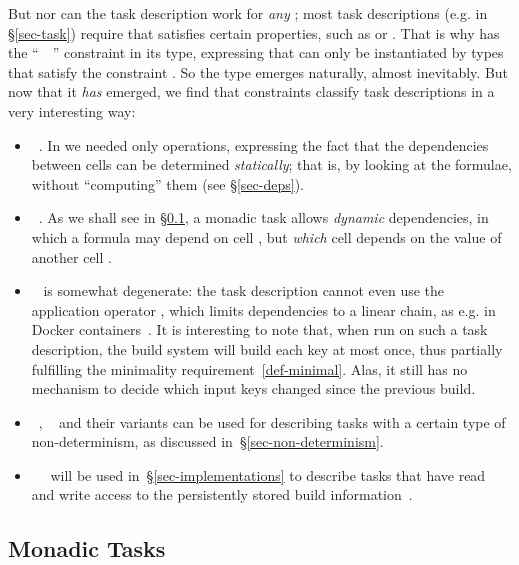 But nor can the task description work for \emph{any} ; most task
descriptions (e.g.  in \S\ref{sec-task}) require that 
satisfies certain properties, such as  or . That is
why  has the ``~~\hs{=>}'' constraint in its type,
expressing that  can only be instantiated by types that satisfy the
constraint . So the type  emerges naturally, almost inevitably.
But now that it \emph{has} emerged, we find that constraints  classify
task descriptions in a very interesting way:
\begin{itemize}
\item {}~. In  we needed only 
  operations, expressing the fact that the dependencies between cells can be
  determined \emph{statically}; that is, by looking at the formulae, without
  ``computing'' them (see \S\ref{sec-deps}).
\item {}~. As we shall see in \S\ref{sec-task-monad}, a monadic
  task allows \emph{dynamic} dependencies, in which a formula may depend on cell
  , but \emph{which} cell  depends on the value of another cell
  .
\item {}~ is somewhat degenerate: the task description cannot
  even use the application operator \hs{<*>}, which limits dependencies to a
  linear chain, as e.g. in Docker containers~\cite{docker}. It is
  interesting to note that, when run on such a task description, the 
  build system will build each key at most once, thus partially fulfilling the
  minimality requirement~\ref{def-minimal}. Alas, it still has no mechanism to
  decide which input keys changed since the previous build.
\item {}~, ~ and their
  variants can be used for describing tasks with a certain type of
  non-determinism, as discussed in~\S\ref{sec-non-determinism}.
\item {}~~ will be used
  in~\S\ref{sec-implementations} to describe tasks that have read and write
  access to the persistently stored build information~.
\end{itemize}

\subsection{Monadic Tasks}\label{sec-task-monad}

